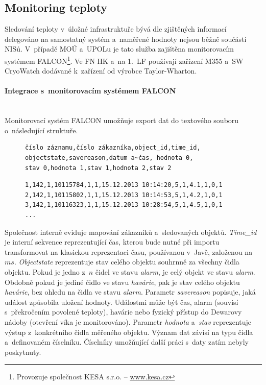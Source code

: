 \documentclass[11pt, draft, oneside]{fithesis2}
\newcommand{\paragraphNewLine}[1]{\paragraph*{#1}\mbox{}\\}
\begin{document}
\subsection{Monitoring teploty}
Sledování teploty v~úložné infrastruktuře bývá dle zjištěných informací delegováno na samostatný systém a~naměřené hodnoty nejsou běžně součástí NISů. 
V~případě MOÚ a~UPOLu je tato služba zajištěna monitorovacím systémem FALCON\footnote{Provozuje společnost KESA s.r.o. -- \url{www.kesa.cz}}. Ve FN HK a~na 1.~LF používají zařízení M355 a~SW CryoWatch dodávané k~zařízení od výrobce Taylor-Wharton. 

\paragraphNewLine{Integrace s~monitorovacím systémem FALCON}
Monitorovací systém FALCON umožňuje export dat do textového souboru o~následující struktuře.

\begin{figure}[h!]
\centering
\begin{BVerbatim}
číslo záznamu,číslo zákazníka,object_id,time_id,
objectstate,savereason,datum a~čas, hodnota 0,
stav 0,hodnota 1,stav 1,hodnota 2,stav 2
\end{BVerbatim}
\end{figure}


\begin{figure}[h!]
\centering
\begin{BVerbatim}
1,142,1,10115784,1,1,15.12.2013 10:14:20,5,1,4.1,1,0,1
2,142,1,10115802,1,1,15.12.2013 10:14:53,5,1,4.2,1,0,1
3,142,1,10116323,1,1,15.12.2013 10:28:54,5,1,4.5,1,0,1
...
\end{BVerbatim}
\end{figure}

Společnost interně eviduje mapování zákazníků a~sledovaných objektů. 
\textit{Time\_id} je interní sekvence reprezentující čas, kterou bude nutné při importu transformovat na klasickou reprezentaci času, používanou v~Javě, založenou na $ms$. \textit{Objectstate} reprezentuje stav celého objektu souhrnně za všechny čidla objektu. Pokud je jedno z~$n$ čidel ve stavu \textit{alarm}, je celý objekt ve stavu \textit{alarm}. Obdobně pokud je jediné čidlo ve stavu \textit{havárie}, pak je stav celého objektu \textit{havárie}, bez ohledu na čidla ve stavu \textit{alarm}. Parametr \textit{savereason} popisuje, jaká událost způsobila uložení hodnoty. Událostmi může být čas, alarm (souvisí s~překročením povolené teploty), havárie nebo fyzický přístup do Dewarovy nádoby (otevření víka je monitorováno). Parametr \textit{hodnota} a~\textit{stav} reprezentuje výstup z~konkrétního čidla měřeného objektu. Význam dat závisí na typu čidla a~definovaném číselníku. Číselníky umožňující další práci s~daty zatím nebyly poskytnuty.
\end{document}
